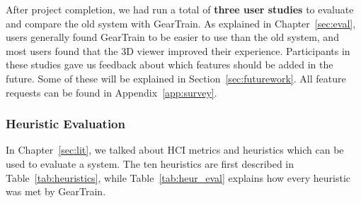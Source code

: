 \begin{doublespace}
After project completion, we had run a total of \textbf{three user studies} to evaluate and compare the old system with GearTrain. As explained in Chapter~\ref{sec:eval}, users generally found GearTrain to be easier to use than the old system, and most users found that the 3D viewer improved their experience. Participants in these studies gave us feedback about which features should be added in the future. Some of these will be explained in Section~\ref{sec:futurework}. All feature requests can be found in Appendix~\ref{app:survey}.

\subsubsection{Heuristic Evaluation}
In Chapter~\ref{sec:lit}, we talked about HCI metrics and heuristics which can be used to evaluate a system. The ten heuristics are first described in Table~\ref{tab:heuristics}, while Table~\ref{tab:heur_eval} explains how every heuristic was met by GearTrain.


\end{doublespace}
